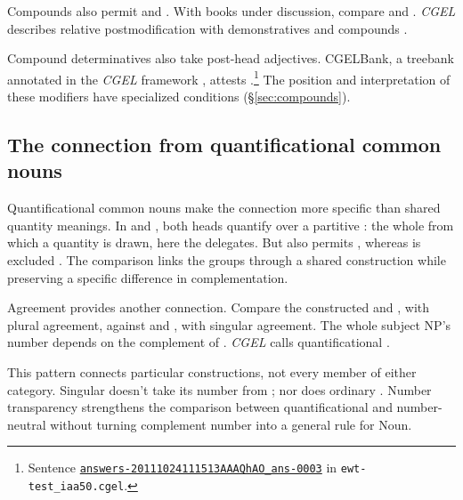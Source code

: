 \documentclass[12pt]{article}
\begin{document}
Compounds also permit  and . With books under discussion, compare  and . \textit{CGEL} describes relative postmodification with demonstratives and compounds \citep[414, 422--423]{huddleston2002}.

Compound determinatives also take post-head adjectives. CGELBank, a treebank annotated in the \textit{CGEL} framework \citep{reynolds2023unified}, attests .\footnote{Sentence \href{https://github.com/nert-nlp/cgel/blob/d0a2c2d8c522b23d5aa879fc9cb94948f4285b2c/datasets/ewt-test_iaa50.cgel\#L179-L181}{\nolinkurl{answers-20111024111513AAAQhAO_ans-0003}} in \nolinkurl{ewt-test_iaa50.cgel}.} The position and interpretation of these modifiers have specialized conditions (§\ref{sec:compounds}).

\subsection{The connection from quantificational common nouns}\label{sec:quant-nouns}

Quantificational common nouns make the connection more specific than shared quantity meanings. In  and , both heads quantify over a partitive : the whole from which a quantity is drawn, here the delegates. But  also permits , whereas  is excluded \citep[349]{huddleston2002}. The comparison links the groups through a shared construction while preserving a specific difference in complementation.

Agreement provides another connection. Compare the constructed  and , with plural agreement, against  and , with singular agreement. The whole subject NP's number depends on the complement of . \textit{CGEL} calls quantificational   \citep[349--350, 411--412]{huddleston2002}.

This pattern connects particular constructions, not every member of either category. Singular  doesn't take its number from ; nor does ordinary . Number transparency strengthens the comparison between quantificational  and number-neutral  without turning complement number into a general rule for Noun.
\end{document}
